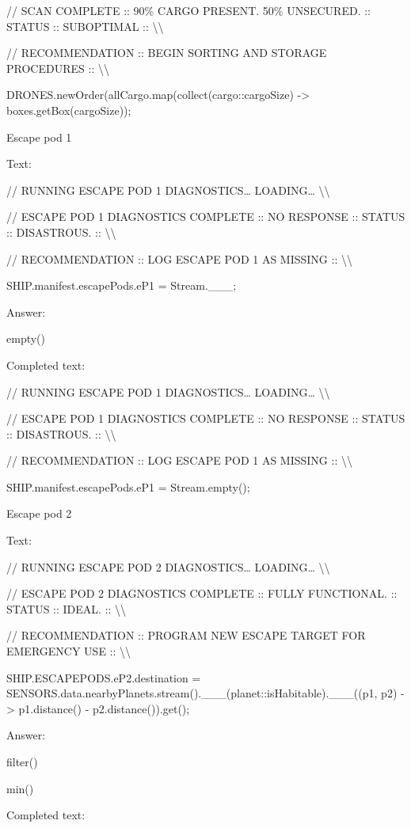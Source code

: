 \documentclass[
]{article}
\begin{document}
// SCAN COMPLETE :: 90\% CARGO PRESENT. 50\% UNSECURED. :: STATUS ::
SUBOPTIMAL :: \textbackslash\textbackslash{}

// RECOMMENDATION :: BEGIN SORTING AND STORAGE PROCEDURES ::
\textbackslash\textbackslash{}

DRONES.newOrder(allCargo.map(collect(cargo::cargoSize) -\textgreater{}
boxes.getBox(cargoSize));

Escape pod 1

Text:

// RUNNING ESCAPE POD 1 DIAGNOSTICS\ldots{} LOADING\ldots{}
\textbackslash\textbackslash{}

// ESCAPE POD 1 DIAGNOSTICS COMPLETE :: NO RESPONSE :: STATUS ::
DISASTROUS. :: \textbackslash\textbackslash{}

// RECOMMENDATION :: LOG ESCAPE POD 1 AS MISSING ::
\textbackslash\textbackslash{}

SHIP.manifest.escapePods.eP1 = Stream.\_\_\_;

Answer:

empty()

Completed text:

// RUNNING ESCAPE POD 1 DIAGNOSTICS\ldots{} LOADING\ldots{}
\textbackslash\textbackslash{}

// ESCAPE POD 1 DIAGNOSTICS COMPLETE :: NO RESPONSE :: STATUS ::
DISASTROUS. :: \textbackslash\textbackslash{}

// RECOMMENDATION :: LOG ESCAPE POD 1 AS MISSING ::
\textbackslash\textbackslash{}

SHIP.manifest.escapePods.eP1 = Stream.empty();

Escape pod 2

Text:

// RUNNING ESCAPE POD 2 DIAGNOSTICS\ldots{} LOADING\ldots{}
\textbackslash\textbackslash{}

// ESCAPE POD 2 DIAGNOSTICS COMPLETE :: FULLY FUNCTIONAL. :: STATUS ::
IDEAL. :: \textbackslash\textbackslash{}

// RECOMMENDATION :: PROGRAM NEW ESCAPE TARGET FOR EMERGENCY USE ::
\textbackslash\textbackslash{}

SHIP.ESCAPEPODS.eP2.destination =
SENSORS.data.nearbyPlanets.stream().\_\_\_(planet::isHabitable).\_\_\_((p1,
p2) -\textgreater{} p1.distance() - p2.distance()).get();

Answer:

filter()

min()

Completed text:
\end{document}
